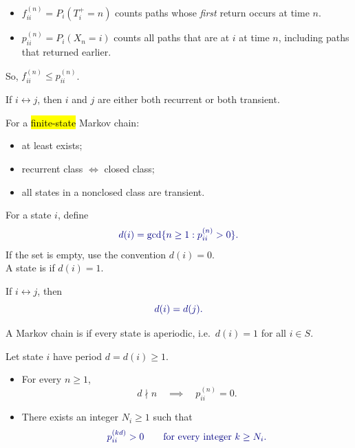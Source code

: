 \documentclass[8pt,a4paper,landscape]{extarticle}
\begin{document}
\begin{cscolumns}
\begin{remark}
\begin{itemize}\setlength\itemsep{0pt}\setlength\topsep{0pt}
\item $f_{ii}^{(n)}=P_i(T_i^{+}=n)$ counts paths whose \emph{first} return occurs at time $n$.
\item $p_{ii}^{(n)}=P_i(X_n=i)$ counts all paths that are at $i$ at time $n$, including paths that returned earlier.
\end{itemize}
\end{remark}

\begin{note}
So, $f_{ii}^{(n)}\le p_{ii}^{(n)}$.
\end{note}

\begin{theorem}
If $i\longleftrightarrow j$, then $i$ and $j$ are either both recurrent or both transient.
\end{theorem}

\begin{theorem}
For a \hl{finite-state} Markov chain:
\begin{itemize}\setlength\itemsep{0pt}\setlength\topsep{0pt}
\item at least  exists;
\item recurrent class $\iff$ closed class;
\item all states in a nonclosed class are transient.
\end{itemize}
\end{theorem}

\begin{definition}[Period]
For a state $i$, define
\[ {\color{csBlue} d(i)=\gcd\{n\ge 1: p_{ii}^{(n)}>0\}.} \]
If the set is empty, use the convention $d(i)=0$.\\
A state is  if $d(i)=1$.
\end{definition}

\begin{theorem}
If $i\longleftrightarrow j$, then
\[ {\color{csBlue} d(i)=d(j).} \]
\end{theorem}

\begin{definition}
A Markov chain is  if every state is aperiodic, i.e.\ $d(i)=1$ for all $i\in S$.
\end{definition}

\begin{theorem}
Let state $i$ have period $d=d(i)\ge 1$.
\begin{itemize}\setlength\itemsep{0pt}\setlength\topsep{0pt}
\item For every $n\ge 1$,
\[ d\nmid n \quad\implies\quad p_{ii}^{(n)}=0. \]
\item There exists an integer $N_i\ge 1$ such that
\[ {\color{csBlue} p_{ii}^{(kd)}>0 \qquad \text{for every integer } k\ge N_i.} \]
\end{itemize}
\end{theorem}


\end{cscolumns}
\end{document}

